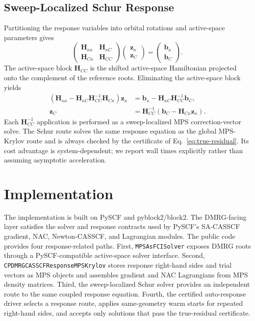 \documentclass[journal=jctcce,manuscript=article]{achemso}
\newcommand{\bfH}{\mathbf{H}}
\begin{document}
\subsection{Sweep-Localized Schur Response}
\label{sec:schur}
Partitioning the response variables into orbital rotations and active-space parameters gives
\begin{equation}
\label{eq:coupled-blocks}
\begin{pmatrix}
\bfH_{\kappa\kappa} & \bfH_{\kappa C}\\
\bfH_{C\kappa} & \bfH_{CC}
\end{pmatrix}
\begin{pmatrix}
\mathbf z_\kappa\\
\mathbf z_C
\end{pmatrix}
=
\begin{pmatrix}
\mathbf b_\kappa\\
\mathbf b_C
\end{pmatrix}.
\end{equation}
The active-space block $\bfH_{CC}$ is the shifted active-space Hamiltonian projected onto the complement of the reference roots.
Eliminating the active-space block yields
\begin{align}
\label{eq:schur}
\left(\bfH_{\kappa\kappa}-\bfH_{\kappa C}\bfH_{CC}^{-1}\bfH_{C\kappa}\right)\mathbf z_\kappa
&=\mathbf b_\kappa-\bfH_{\kappa C}\bfH_{CC}^{-1}\mathbf b_C,\\
\mathbf z_C&=\bfH_{CC}^{-1}\left(\mathbf b_C-\bfH_{C\kappa}\mathbf z_\kappa\right).
\end{align}
Each $\bfH_{CC}^{-1}$ application is performed as a sweep-localized MPS correction-vector solve.
The Schur route solves the same response equation as the global MPS-Krylov route and is always checked by the certificate of Eq.~\eqref{eq:true-residual}.
Its cost advantage is system-dependent; we report wall times explicitly rather than assuming asymptotic acceleration.

\section{Implementation}
The implementation is built on PySCF and pyblock2/block2.\cite{Sun2018PySCF,Sun2020PySCF,Zhai2023Block2}
The DMRG-facing layer satisfies the solver and response contracts used by PySCF's SA-CASSCF gradient, NAC, Newton-CASSCF, and Lagrangian modules.
The public code provides four response-related paths.
First, \texttt{MPSAsFCISolver} exposes DMRG roots through a PySCF-compatible active-space solver interface.
Second, \texttt{CPDMRGCASSCFResponseMPSKrylov} stores response right-hand sides and trial vectors as MPS objects and assembles gradient and NAC Lagrangians from MPS density matrices.
Third, the sweep-localized Schur solver provides an independent route to the same coupled response equation.
Fourth, the certified auto-response driver selects a response route, applies same-geometry warm starts for repeated right-hand sides, and accepts only solutions that pass the true-residual certificate.
\end{document}
